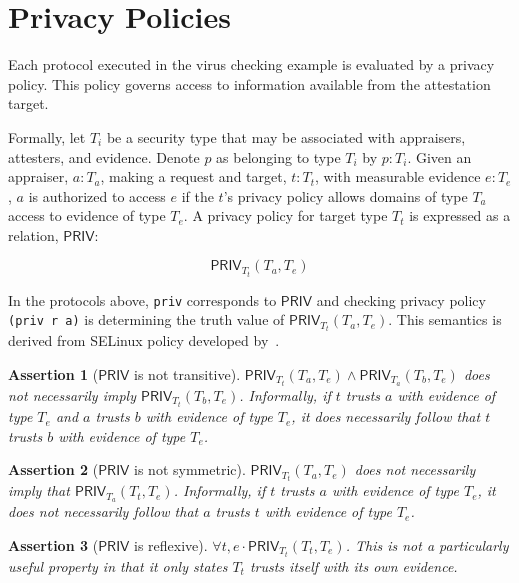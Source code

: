 \documentclass[10pt]{article}
\newtheorem{assertion}{Assertion}
\begin{document}
{\section*{Privacy Policies}

Each protocol executed in the virus checking example is evaluated by a
privacy policy.  This policy governs access to information available
from the attestation target.  

Formally, let $T_i$ be a security type that may be associated with
appraisers, attesters, and evidence.  Denote $p$ as
belonging to type $T_i$ by $p:T_i$.  Given an appraiser, $a:T_a$,
making a request and target, $t:T_t$, with measurable evidence
$e:T_e$, $a$ is authorized to access $e$ if the $t$'s privacy policy
allows domains of type $T_a$ access to evidence of type $T_e$. A
privacy policy for target type $T_t$ is expressed as a relation,
$\mathsf{PRIV}$:

\[\mathsf{PRIV}_{T_t}(T_a,T_e)\]

In the protocols above, \Verb+priv+ corresponds to $\mathsf{PRIV}$ and
checking privacy policy \Verb+(priv r a)+ is determining the truth
value of $\mathsf{PRIV}_{T_t}(T_a,T_e)$.  This semantics is derived
from SELinux policy developed by~\citet{Hicks:07:A-logical-speci}.

\begin{assertion}[$\mathsf{PRIV}$ is not transitive]
  $\mathsf{PRIV}_{T_t}(T_a,T_e)\wedge\mathsf{PRIV}_{T_a}(T_b,T_e)$
  does not necessarily imply $\mathsf{PRIV}_{T_t}(T_b,T_e)$.
  Informally, if $t$ trusts $a$ with evidence of type $T_e$ and $a$
  trusts $b$ with evidence of type $T_e$, it does necessarily follow
  that $t$ trusts $b$ with evidence of type $T_e$.
\end{assertion}

\begin{assertion}[$\mathsf{PRIV}$ is not symmetric]
  $\mathsf{PRIV}_{T_t}(T_a,T_e)$ does not necessarily imply that
  $\mathsf{PRIV}_{T_a}(T_t,T_e)$.  Informally, if $t$ trusts $a$ with
  evidence of type $T_e$, it does not necessarily follow that $a$
  trusts $t$ with evidence of type $T_e$.
\end{assertion}

\begin{assertion}[$\mathsf{PRIV}$ is reflexive]
  $\forall t,e\cdot\mathsf{PRIV}_{T_t}(T_t,T_e)$. This is not a
  particularly useful property in that it only states $T_t$ trusts
  itself with its own evidence.
\end{assertion}

}
\end{document}
